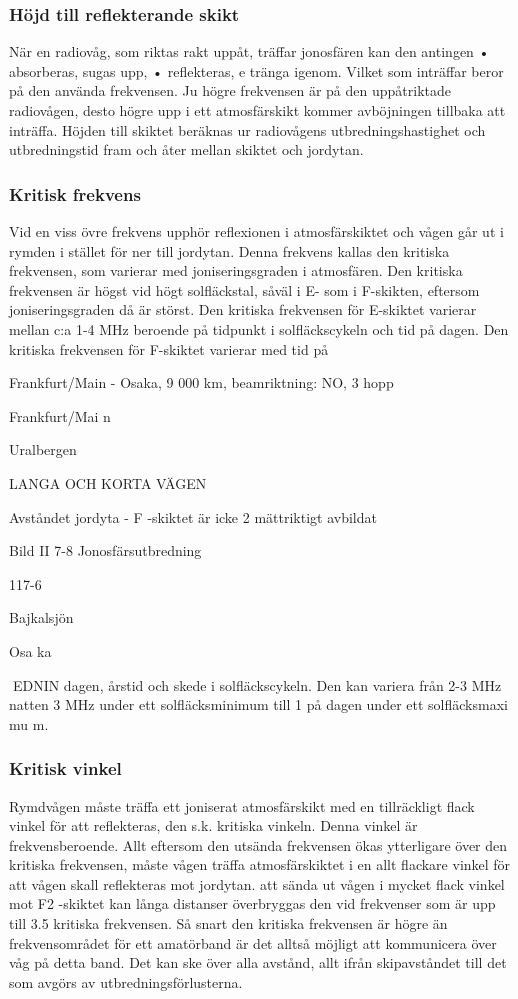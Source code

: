\subsubsection{Höjd till reflekterande skikt}

När en radiovåg, som riktas rakt uppåt, träffar jonosfären kan den antingen
• absorberas, sugas upp,
• reflekteras,
e
tränga igenom.
Vilket som inträffar beror på den använda
frekvensen. Ju högre frekvensen är på den
uppåtriktade radiovågen, desto högre upp i
ett atmosfärskikt kommer avböjningen tillbaka att inträffa. Höjden till skiktet beräknas
ur radiovågens utbredningshastighet och
utbredningstid fram och åter mellan skiktet
och jordytan.

\subsubsection{Kritisk frekvens}
Vid en viss övre frekvens upphör reflexionen
i atmosfärskiktet och vågen går ut i rymden
i stället för ner till jordytan. Denna frekvens
kallas den kritiska frekvensen, som varierar
med joniseringsgraden i atmosfären. Den
kritiska frekvensen är högst vid högt solfläckstal, såväl i E- som i F-skikten, eftersom
joniseringsgraden då är störst. Den kritiska
frekvensen för E-skiktet varierar mellan c:a
1-4 MHz beroende på tidpunkt i solfläckscykeln och tid på dagen. Den kritiska frekvensen för F-skiktet varierar med tid på

Frankfurt/Main - Osaka, 9 000 km, beamriktning: NO, 3 hopp

Frankfurt/Mai n

Uralbergen

LANGA OCH KORTA VÄGEN

Avståndet jordyta - F -skiktet är icke
2
mättriktigt avbildat

Bild II 7-8 Jonosfärsutbredning

117-6

Bajkalsjön

Osa ka

EDNIN
dagen, årstid och skede i solfläckscykeln.
Den kan variera från 2-3 MHz
natten
3 MHz
under ett solfläcksminimum till 1
på dagen under ett solfläcksmaxi mu m.

\subsubsection{Kritisk vinkel}
Rymdvågen måste träffa ett joniserat atmosfärskikt med en tillräckligt flack vinkel för att
reflekteras, den s.k. kritiska vinkeln. Denna
vinkel är frekvensberoende. Allt eftersom
den utsända frekvensen ökas ytterligare över
den kritiska frekvensen, måste vågen träffa
atmosfärskiktet i en allt flackare vinkel för att
vågen skall reflekteras mot jordytan.
att sända ut vågen i mycket flack vinkel mot
F2 -skiktet kan långa distanser överbryggas
den
vid frekvenser som är upp till 3.5
kritiska frekvensen.
Så snart den kritiska frekvensen är högre
än frekvensområdet för ett amatörband är
det alltså möjligt att kommunicera över
våg på detta band. Det kan ske över alla
avstånd, allt ifrån skipavståndet till det som
avgörs av utbredningsförlusterna.

